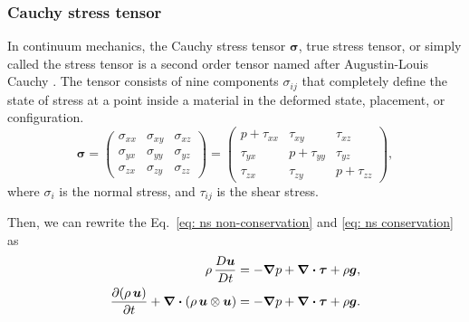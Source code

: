 \subsubsection{Cauchy stress tensor}
In continuum mechanics, the Cauchy stress tensor $\bm{\sigma}$, true stress tensor, or simply called the stress tensor is a second order tensor named after Augustin-Louis Cauchy \citep{wiki:stresstensor}. 
The tensor consists of nine components $\sigma _{ij}$ that completely define the state of stress at a point inside a material in the deformed state, placement, or configuration.
\begin{equation}
    \bm{\sigma} = 
    \begin{pmatrix}
        {\sigma_{x x}} & {\sigma_{x y}} & {\sigma_{x z}} \\
        {\sigma_{y x}} & {\sigma_{y y}} & {\sigma_{y z}} \\ 
        {\sigma_{z x}} & {\sigma_{z y}} & {\sigma_{z z}}
    \end{pmatrix}
    = 
    \begin{pmatrix}
        {p+ \tau_{xx}} & {\tau_{x y}} & {\tau_{x z}} \\ 
        {\tau_{y x}} & {p+ \tau_{yy}} & {\tau_{y z}} \\ 
        {\tau_{z x}} & {\tau_{z y}} & {p+ \tau_{zz}}
    \end{pmatrix}, 
\end{equation}
where $\sigma_i$ is the normal stress, and $\tau_{ij}$ is the shear stress. 

Then, we can rewrite the Eq.~\eqref{eq: ns non-conservation} and \eqref{eq: ns conservation} as 
\begin{align}
    \rho \, \frac{D \bm{u}}{D t}
    &= -\grad p + \div \bm{\tau} + \rho \bm{g}, 
    \\
    \pdv{(\rho \, \bm{u})}{t} + \div (\rho \, \bm{u} \otimes \bm{u})
    &= -\grad p + \div \bm{\tau} + \rho \bm{g}. 
\end{align}